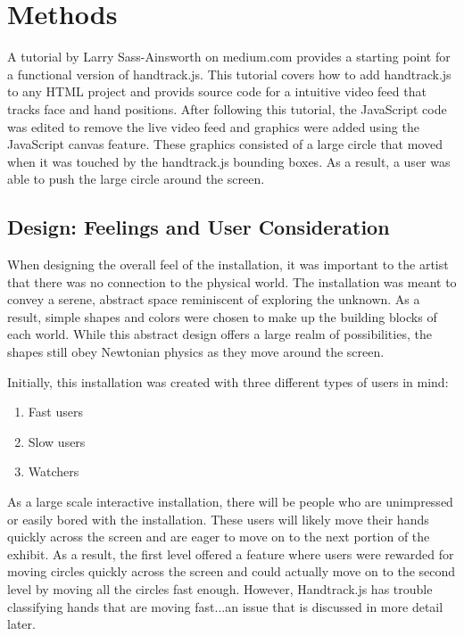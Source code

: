 \documentclass[10pt,twocolumn]{article}
\begin{document}
\section{Methods}
 A tutorial by Larry Sass-Ainsworth on medium.com \cite{sass-ainsworth_getting_2019} provides a starting point for a functional version of handtrack.js.  This tutorial covers how to add handtrack.js to any HTML project and provids source code for a intuitive video feed that tracks face and hand positions. After following this tutorial, the JavaScript code was edited to remove the live video feed and graphics were added using the JavaScript canvas feature.  These graphics consisted of a large circle that moved when it was touched by the handtrack.js bounding boxes.  As a result, a user was able to push the large circle around the screen. 
 
 
\subsection{Design: Feelings and User Consideration}
 When designing the overall feel of the installation, it was important to the artist that there was no connection to the physical world.  The installation was meant to convey a serene, abstract space reminiscent of exploring the unknown.  As a result, simple shapes and colors were chosen to make up the building blocks of each world. While this abstract design offers a large realm of possibilities, the shapes still obey Newtonian physics as they move around the screen.    
 
 Initially, this installation was created with three different types of users in mind:
 \begin{enumerate}
  \item Fast users
  \item Slow users
  \item Watchers
\end{enumerate}
  As a large scale interactive installation, there will be people who are unimpressed or easily bored with the installation.  These users will likely move their hands quickly across the screen and are eager to move on to the next portion of the exhibit. As a result, the first level offered a feature where users were rewarded for moving circles quickly across the screen and could actually move on to the second level by moving all the circles fast enough.  However, Handtrack.js has trouble classifying hands that are moving fast...an issue that is discussed in more detail later. 
 
\end{document}
